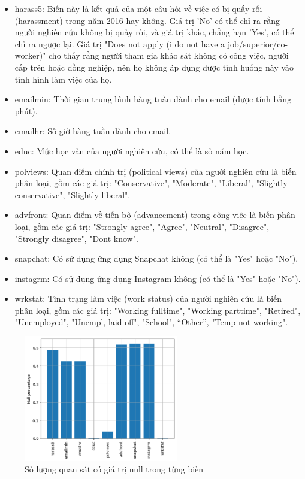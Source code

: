 \begin{itemize}
    \item harass5: Biến này là kết quả của một câu hỏi về việc có bị quấy rối (harassment) trong năm 2016 hay không. 
    Giá trị 'No' có thể chỉ ra rằng người nghiên cứu không bị quấy rối, và giá trị khác, chẳng hạn 'Yes', có thể chỉ ra ngược lại. Giá trị "Does not apply (i do not have a job/superior/co-worker)" cho thấy rằng người tham gia khảo sát không có công việc, người cấp trên hoặc đồng nghiệp, nên họ không áp dụng được tình huống này vào tình hình làm việc của họ.
    \item emailmin: Thời gian trung bình hàng tuần dành cho email (được tính bằng phút).
    \item emailhr: Số giờ hàng tuần dành cho email.
    \item educ: Mức học vấn của người nghiên cứu, có thể là số năm học.
    \item polviews: Quan điểm chính trị (political views) của người nghiên cứu là biến phân loại, gồm các giá trị: "Conservative", "Moderate", "Liberal", "Slightly conservative", "Slightly liberal".
    \item advfront: Quan điểm về tiến bộ (advancement) trong công việc là biến phân loại, gồm các giá trị: "Strongly agree", "Agree", "Neutral", "Disagree", "Strongly disagree", "Dont know".
    \item snapchat: Có sử dụng ứng dụng Snapchat không (có thể là "Yes" hoặc "No").
    \item instagrm: Có sử dụng ứng dụng Instagram không (có thể là "Yes" hoặc "No").
    \item wrkstat: Tình trạng làm việc (work status) của người nghiên cứu là biến phân loại, gồm các giá trị: "Working fulltime", "Working parttime", "Retired", "Unemployed", "Unempl, laid off", "School", “Other”, "Temp not working".
\end{itemize}

\begin{figure}[h!]
    \centering
    \includegraphics[width=0.6\textwidth]{figures/Thanh/Data_Analysis/null_percentage_columns.png}
    \caption{Số lượng quan sát có giá trị null trong từng biến}
    \label{fig:null_percentage_columns}
\end{figure}

